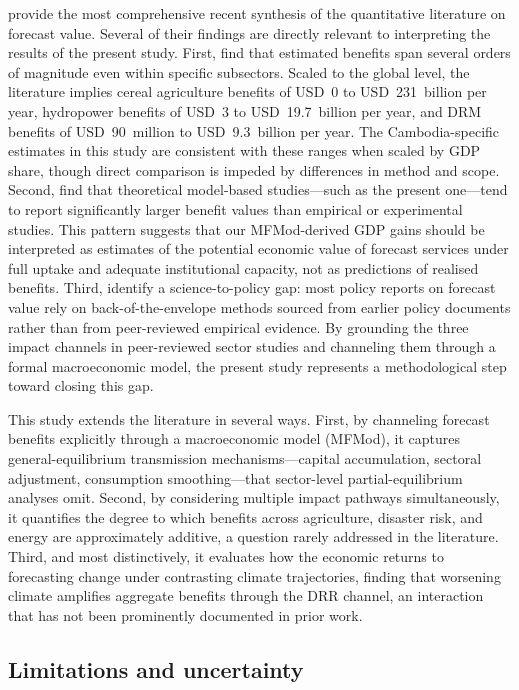 \documentclass[
  final,
  10pt,
  letterpaper,
  english,
]{article}
\begin{document}
\textcite{farkas2025economic} provide the most comprehensive recent synthesis of the
quantitative literature on forecast value. Several of their findings are
directly relevant to interpreting the results of the present study. First,
\textcite{farkas2025economic} find that estimated benefits span several orders of
magnitude even within specific subsectors. Scaled to the global level, the
literature implies cereal agriculture benefits of USD~0 to USD~231~billion per
year, hydropower benefits of USD~3 to USD~19.7~billion per year, and DRM
benefits of USD~90~million to USD~9.3~billion per year. The Cambodia-specific
estimates in this study are consistent with these ranges when scaled by GDP
share, though direct comparison is impeded by differences in method and scope.
Second, \textcite{farkas2025economic} find that theoretical model-based studies---such as
the present one---tend to report significantly larger benefit values than
empirical or experimental studies. This pattern suggests that our MFMod-derived
GDP gains should be interpreted as estimates of the potential economic value of
forecast services under full uptake and adequate institutional capacity, not as
predictions of realised benefits. Third, \textcite{farkas2025economic} identify a
science-to-policy gap: most policy reports on forecast value rely on
back-of-the-envelope methods sourced from earlier policy documents rather than
from peer-reviewed empirical evidence. By grounding the three impact channels in
peer-reviewed sector studies and channeling them through a formal macroeconomic
model, the present study represents a methodological step toward closing this
gap.

This study extends the literature in several ways. First, by channeling forecast
benefits explicitly through a macroeconomic model (MFMod), it captures
general-equilibrium transmission mechanisms---capital accumulation, sectoral
adjustment, consumption smoothing---that sector-level partial-equilibrium analyses
omit. Second, by considering multiple impact pathways simultaneously, it
quantifies the degree to which benefits across agriculture, disaster risk, and
energy are approximately additive, a question rarely addressed in the
literature. Third, and most distinctively, it evaluates how the economic returns
to forecasting change under contrasting climate trajectories, finding that
worsening climate amplifies aggregate benefits through the DRR channel, an
interaction that has not been prominently documented in prior work.


\subsection{Limitations and uncertainty}
\label{sec:discussion_limitations}
\end{document}
